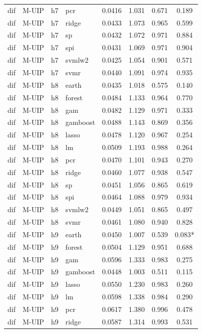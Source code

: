 \begin{ThreePartTable}
\begin{longtable}[t]{llclcccc}
dif & M-UIP & h7 & pcr & 0.0416 & 1.031 & 0.671 & 0.189\\
dif & M-UIP & h7 & ridge & 0.0433 & 1.073 & 0.965 & 0.599\\
dif & M-UIP & h7 & sp & 0.0432 & 1.072 & 0.971 & 0.884\\
dif & M-UIP & h7 & spi & 0.0431 & 1.069 & 0.971 & 0.904\\
dif & M-UIP & h7 & svmlw2 & 0.0425 & 1.054 & 0.901 & 0.571\\
dif & M-UIP & h7 & svmr & 0.0440 & 1.091 & 0.974 & 0.935\\
\addlinespace
dif & M-UIP & h8 & earth & 0.0435 & 1.018 & 0.575 & 0.140\\
dif & M-UIP & h8 & forest & 0.0484 & 1.133 & 0.964 & 0.770\\
dif & M-UIP & h8 & gam & 0.0482 & 1.129 & 0.971 & 0.333\\
dif & M-UIP & h8 & gamboost & 0.0488 & 1.143 & 0.869 & 0.356\\
dif & M-UIP & h8 & lasso & 0.0478 & 1.120 & 0.967 & 0.254\\
dif & M-UIP & h8 & lm & 0.0509 & 1.193 & 0.988 & 0.264\\
dif & M-UIP & h8 & pcr & 0.0470 & 1.101 & 0.943 & 0.270\\
dif & M-UIP & h8 & ridge & 0.0460 & 1.077 & 0.938 & 0.547\\
dif & M-UIP & h8 & sp & 0.0451 & 1.056 & 0.865 & 0.619\\
dif & M-UIP & h8 & spi & 0.0464 & 1.088 & 0.979 & 0.934\\
dif & M-UIP & h8 & svmlw2 & 0.0449 & 1.051 & 0.865 & 0.497\\
dif & M-UIP & h8 & svmr & 0.0461 & 1.080 & 0.940 & 0.828\\
\addlinespace
dif & M-UIP & h9 & earth & 0.0450 & 1.007 & 0.539 & 0.083*\\
dif & M-UIP & h9 & forest & 0.0504 & 1.129 & 0.951 & 0.688\\
dif & M-UIP & h9 & gam & 0.0596 & 1.333 & 0.983 & 0.275\\
dif & M-UIP & h9 & gamboost & 0.0448 & 1.003 & 0.511 & 0.115\\
dif & M-UIP & h9 & lasso & 0.0550 & 1.230 & 0.983 & 0.260\\
dif & M-UIP & h9 & lm & 0.0598 & 1.338 & 0.984 & 0.290\\
dif & M-UIP & h9 & pcr & 0.0617 & 1.380 & 0.996 & 0.478\\
dif & M-UIP & h9 & ridge & 0.0587 & 1.314 & 0.993 & 0.531\\

\end{longtable}
\end{ThreePartTable}
